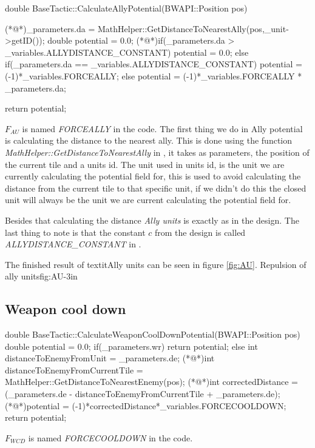 {	
		\begin{Sourcecode}[caption=Ally units]
double BaseTactic::CalculateAllyPotential(BWAPI::Position pos)
{
	(*@\lnote@*)_parameters.da = MathHelper::GetDistanceToNearestAlly(pos,_unit->getID());
	double potential = 0.0;
	(*@\lnote@*)if(_parameters.da > _variables.ALLYDISTANCE_CONSTANT)
		potential = 0.0;
	else if(_parameters.da == _variables.ALLYDISTANCE_CONSTANT)
		potential = (-1)*_variables.FORCEALLY;
	else
		potential = (-1)*_variables.FORCEALLY * _parameters.da;
	
	return potential;
}
\end{Sourcecode}	
	$F_{AU}$ is named \textit{FORCEALLY} in the code. 
	The first thing we do in Ally potential is calculating the distance to the nearest ally. This is done using the function \textit{MathHelper::GetDistanceToNearestAlly} in , it takes as parameters, the position of the current tile and a units id. The unit used in units id, is the unit we are currently calculating the potential field for, this is used to avoid calculating the distance from the current tile to that specific unit, if we didn't do this the closed unit will always be the unit we are current calculating the potential field for.
	
	Besides that calculating the distance \textit{Ally units} is exactly as in the design. The last thing to note is that the constant $c$ from the design is called \textit{ALLYDISTANCE\_CONSTANT} in .
	
	The finished result of textit{Ally units} can be seen in figure \ref{fig:AU}.
			{Repulsion of ally units}{fig:AU}{-3in}
	
	\subsection{Weapon cool down}
		\begin{Sourcecode}[caption=Weapon cool down]
double BaseTactic::CalculateWeaponCoolDownPotential(BWAPI::Position pos)
{
	double potential = 0.0;
	if(_parameters.wr)
		return potential;
	else
	{
		int distanceToEnemyFromUnit = _parameters.de;
		(*@\lnote@*)int distanceToEnemyFromCurrentTile = MathHelper::GetDistanceToNearestEnemy(pos);
		(*@\lnote@*)int correctedDistance = (_parameters.de - distanceToEnemyFromCurrentTile + _parameters.de);
		(*@\lnote@*)potential = (-1)*correctedDistance*_variables.FORCECOOLDOWN;
		return potential;
	}
}
\end{Sourcecode}		
	$F_{WCD}$ is named \textit{FORCECOOLDOWN} in the code. 
	
}
